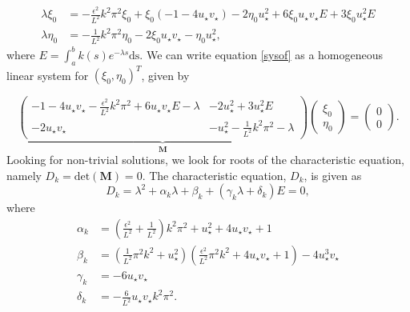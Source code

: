\begin{equation}\label{sysof}
  \begin{split}
\lambda\xi_0&=-\frac{\epsilon^2}{L^2}k^2\pi^2\xi_0+\xi_0(-1-4u_\star v_\star)-2\eta_0u_\star^2+6\xi_0u_\star v_\star E+3\xi_0u_\star^2E \\
\lambda\eta_0&=-\frac{1}{L^2}k^2\pi^2\eta_0-2\xi_0u_\star v_\star-\eta_0u_\star^2,
\end{split}
\end{equation}
where $E=\int_a^bk(s)e^{-\lambda s}\text{ds}$. We can write equation \eqref{sysof} as a homogeneous linear system for $(\xi_0,\eta_0)^T$, given by

\begin{equation}
\underbrace{\begin{pmatrix}-1-4u_\star v_\star-\frac{\epsilon^2}{L^2}k^2\pi^2+6u_\star v_\star E-\lambda&-2u_\star^2+3u_\star^2E\\-2u_\star v_\star&-u_\star^2-\frac{1}{L^2}k^2\pi^2-\lambda \end{pmatrix}}_{\textbf{M}}\begin{pmatrix}\xi_0\\\eta_0\end{pmatrix}=\begin{pmatrix}0\\0\end{pmatrix}.
\end{equation}
Looking for non-trivial solutions, we look for roots of the characteristic equation, namely $D_k=\text{det}(\textbf{M})=0$. The characteristic equation, $D_k$, is given as
\begin{equation}\label{characdist}
  D_k=\lambda^2+\alpha_k\lambda+\beta_k+(\gamma_k\lambda+\delta_k)E=0,
\end{equation}
where
\begin{align}
\alpha_k&=\left(\frac{\epsilon^2}{L^2}+\frac{1}{L^2}\right)k^2\pi^2+u_\star^2+4u_\star v_\star+1\\
\beta_k&=\left(\frac{1}{L^2}\pi^2k^2+u_\star^2\right)\left(\frac{\epsilon^2}{L^2}\pi^2k^2+4u_\star v_\star+1\right)-4u_\star^3v_\star\\
\gamma_k&=-6u_\star v_\star\\
\delta_k&=-\frac{6}{L^2}u_\star v_\star k^2\pi^2.
\end{align}

